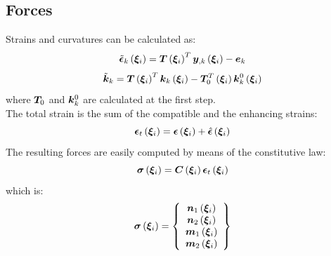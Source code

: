 \subsection{Forces}
Strains and curvatures can be calculated as:
\begin{equation}
\tilde{\T{\epsilon}}_k \valxii  =
\T{T} \valxii ^T \T{y}_{,k} \valxii - \T{e}_k
\end{equation}
\begin{equation}
\tilde{\T{k}}_k  =
\T{T} \valxii ^ T \T{k}_k \valxii - \T{T}_0 ^ T \valxii \T{k}^{0}_{k} \valxii
\end{equation}
where $\T{T}_0$ and $\T{k}^{0}_{k}$ are calculated at the first step.\\
The total strain is the sum of the compatible and the enhancing strains:
\begin{equation}
\T{\epsilon}_t \valxii =
\T{\epsilon} \valxii +
\hat{ \T{\epsilon} } \valxii
\end{equation}
The resulting forces are easily computed by means of the constitutive law:
\begin{equation}
\T{\sigma} \valxii =
\T{C}\valxii \T{\epsilon}_t \valxii
\end{equation}
which is:
\begin{equation}
\T{\sigma} \valxii =
\cubr{\vvect{c}{
\T{n}_1 \valxii \\
\T{n}_2 \valxii \\
\T{m}_1 \valxii \\
\T{m}_2 \valxii
}}
\end{equation}
